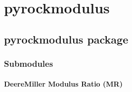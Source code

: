 \documentclass[letterpaper,10pt,english]{sphinxmanual}
\begin{document}
\sphinxAtStartPar
{}

\sphinxstepscope


\chapter{pyrockmodulus}
\label{\detokenize{modules:pyrockmodulus}}\label{\detokenize{modules::doc}}
\sphinxstepscope


\section{pyrockmodulus package}
\label{\detokenize{pyrockmodulus:pyrockmodulus-package}}\label{\detokenize{pyrockmodulus::doc}}

\subsection{Submodules}
\label{\detokenize{pyrockmodulus:submodules}}

\subsubsection{Deere\sphinxhyphen{}Miller \sphinxhyphen{} Modulus Ratio (MR)}
\label{\detokenize{pyrockmodulus:module-pyrockmodulus.pyrockmodulus}}\label{\detokenize{pyrockmodulus:deere-miller-modulus-ratio-mr}}
\end{document}

